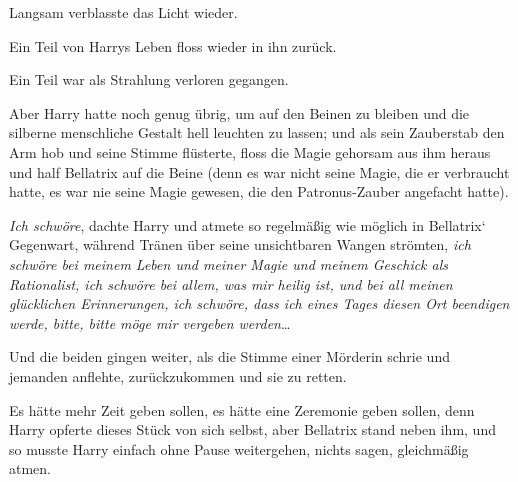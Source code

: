 Langsam verblasste das Licht wieder.

Ein Teil von Harrys Leben floss wieder in ihn zurück.

Ein Teil war als Strahlung verloren gegangen.

Aber Harry hatte noch genug übrig, um auf den Beinen zu bleiben und die silberne menschliche Gestalt hell leuchten zu lassen; und als sein Zauberstab den Arm hob und seine Stimme  flüsterte, floss die Magie gehorsam aus ihm heraus und half Bellatrix auf die Beine (denn es war nicht seine Magie, die er verbraucht hatte, es war nie seine Magie gewesen, die den Patronus-Zauber angefacht hatte).

\emph{Ich schwöre}, dachte Harry und atmete so regelmäßig wie möglich in Bellatrix‘ Gegenwart, während Tränen über seine unsichtbaren Wangen strömten, \emph{ich schwöre bei meinem Leben und meiner Magie und meinem Geschick als Rationalist, ich schwöre bei allem, was mir heilig ist, und bei all meinen glücklichen Erinnerungen, ich schwöre, dass ich eines Tages diesen Ort beendigen werde, bitte, bitte möge mir vergeben werden}…

Und die beiden gingen weiter, als die Stimme einer Mörderin schrie und jemanden anflehte, zurückzukommen und sie zu retten.

Es hätte mehr Zeit geben sollen, es hätte eine Zeremonie geben sollen, denn Harry opferte dieses Stück von sich selbst, aber Bellatrix stand neben ihm, und so musste Harry einfach ohne Pause weitergehen, nichts sagen, gleichmäßig atmen.

